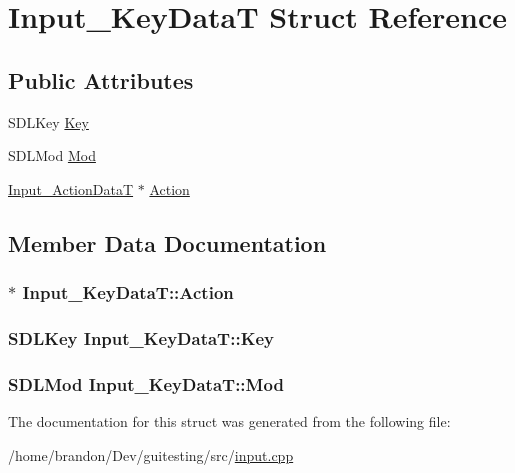 \hypertarget{struct_input___key_data_t}{
\section{Input\_\-KeyDataT Struct Reference}
\label{struct_input___key_data_t}
}
\subsection*{Public Attributes}
\begin{CompactItemize}
\item 
SDLKey \hyperlink{struct_input___key_data_t_0023b2f42397de796a32cf18b376f127}{Key}
\item 
SDLMod \hyperlink{struct_input___key_data_t_028353827a410b2b52d8b47f9b5c91ea}{Mod}
\item 
\hyperlink{struct_input___action_data_t}{Input\_\-ActionDataT} $\ast$ \hyperlink{struct_input___key_data_t_3142dedc1e2c0b261dcb9a3953401e96}{Action}
\end{CompactItemize}


\subsection{Member Data Documentation}
\hypertarget{struct_input___key_data_t_3142dedc1e2c0b261dcb9a3953401e96}{
\subsubsection[{Action}]{$\ast$ {\bf Input\_\-KeyDataT::Action}}}
\label{struct_input___key_data_t_3142dedc1e2c0b261dcb9a3953401e96}


\hypertarget{struct_input___key_data_t_0023b2f42397de796a32cf18b376f127}{
\subsubsection[{Key}]{\setlength{\rightskip}{0pt plus 5cm}SDLKey {\bf Input\_\-KeyDataT::Key}}}
\label{struct_input___key_data_t_0023b2f42397de796a32cf18b376f127}


\hypertarget{struct_input___key_data_t_028353827a410b2b52d8b47f9b5c91ea}{
\subsubsection[{Mod}]{\setlength{\rightskip}{0pt plus 5cm}SDLMod {\bf Input\_\-KeyDataT::Mod}}}
\label{struct_input___key_data_t_028353827a410b2b52d8b47f9b5c91ea}




The documentation for this struct was generated from the following file:\begin{CompactItemize}
\item 
/home/brandon/Dev/guitesting/src/\hyperlink{input_8cpp}{input.cpp}\end{CompactItemize}
